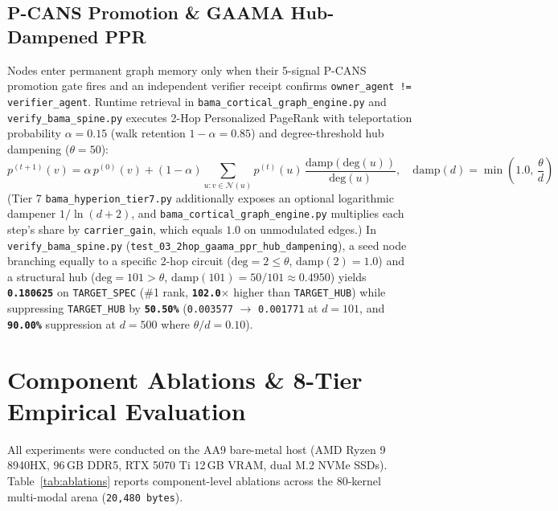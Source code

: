 \documentclass[10pt,twocolumn,letterpaper]{article}
\begin{document}
\subsection{P-CANS Promotion \& GAAMA Hub-Dampened PPR}
Nodes enter permanent graph memory only when their 5-signal P-CANS promotion gate fires and an independent verifier receipt confirms \texttt{owner\_agent != verifier\_agent}. Runtime retrieval in \texttt{bama\_cortical\_graph\_engine.py} and \texttt{verify\_bama\_spine.py} executes 2-Hop Personalized PageRank \cite{page1999pagerank} with teleportation probability $\alpha=0.15$ (walk retention $1-\alpha=0.85$) and degree-threshold hub dampening ($\theta=50$):
\begin{equation}
p^{(t+1)}(v) = \alpha\,p^{(0)}(v) + (1-\alpha)\sum_{u : v \in \mathcal{N}(u)} p^{(t)}(u)\,\frac{\text{damp}(\text{deg}(u))}{\text{deg}(u)}, \quad \text{damp}(d) = \min\!\left(1.0,\, \frac{\theta}{d}\right)
\end{equation}
(Tier 7 \texttt{bama\_hyperion\_tier7.py} additionally exposes an optional logarithmic dampener $1/\ln(d+2)$, and \texttt{bama\_cortical\_graph\_engine.py} multiplies each step's share by \texttt{carrier\_gain}, which equals $1.0$ on unmodulated edges.) In \texttt{verify\_bama\_spine.py} (\texttt{test\_03\_2hop\_gaama\_ppr\_hub\_dampening}), a seed node branching equally to a specific 2-hop circuit ($\text{deg}=2 \le \theta$, $\text{damp}(2)=1.0$) and a structural hub ($\text{deg}=101 > \theta$, $\text{damp}(101)=50/101 \approx 0.4950$) yields \textbf{\texttt{0.180625}} on \texttt{TARGET\_SPEC} (\#1 rank, \textbf{\texttt{102.0$\times$}} higher than \texttt{TARGET\_HUB}) while suppressing \texttt{TARGET\_HUB} by \textbf{\texttt{50.50\%}} (\texttt{0.003577} $\to$ \texttt{0.001771} at $d=101$, and \textbf{\texttt{90.00\%}} suppression at $d=500$ where $\theta/d = 0.10$).

\section{Component Ablations \& 8-Tier Empirical Evaluation}
All experiments were conducted on the AA9 bare-metal host (AMD Ryzen 9 8940HX, 96\,GB DDR5, RTX 5070 Ti 12\,GB VRAM, dual M.2 NVMe SSDs). Table~\ref{tab:ablations} reports component-level ablations across the 80-kernel multi-modal arena (\texttt{20,480 bytes}).
\end{document}
